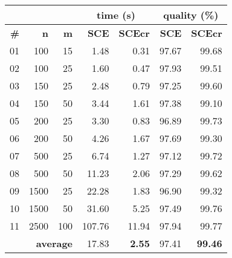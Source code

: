 \begin{tabular}{|r|r|r|r|r|r|r|} \cline{4-7}
		\multicolumn{3}{c|}{} & \multicolumn{2}{c|}{\bf time (s)} & \multicolumn{2}{c|}{\bf quality (\%)} \\ \hline
		\textbf{\#} & \textbf{n}   & \textbf{m}  & {\bf SCE } & {\bf SCEcr } & {\bf SCE} & {\bf SCEcr} \\ \hline
01 & 100 & 15 & 1.48   & 0.31 & 97.67 &  99.68 \\ \hline
02 & 100 & 25 & 1.60   & 0.47 & 97.93 &  99.51 \\ \hline
03 & 150 & 25 & 2.48   & 0.79 & 97.25 &  99.60 \\ \hline
04 & 150 & 50 & 3.44   & 1.61 & 97.38 &  99.10 \\ \hline
05 & 200 & 25 & 3.30   & 0.83 & 96.89 &  99.73 \\ \hline
06 & 200 & 50 & 4.26   & 1.67 & 97.69 &  99.30 \\ \hline
07 & 500 & 25 & 6.74   & 1.27 & 97.12 &  99.72 \\ \hline
08 & 500 & 50 & 11.23  & 2.06 & 97.29 &  99.62 \\ \hline
09 &1500 & 25 & 22.28  & 1.83 & 96.90 &  99.32 \\ \hline
10 &1500 & 50 & 31.60  & 5.25 & 97.49 &  99.76 \\ \hline
11 &2500 &100 &107.76  &11.94 & 97.94 & 99.77 \\ \hline
    \multicolumn{3}{|r|}{\textbf{average }} & {17.83} & \multicolumn{1}{r|}{\bf 2.55 } & {97.41} & {\bf 99.46}  \\ \hline
\end{tabular}
